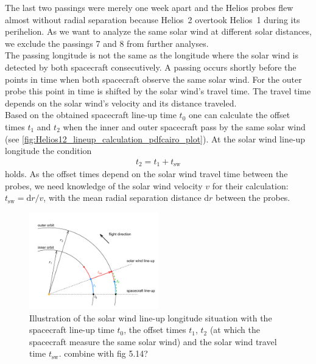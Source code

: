 
The last two passings were merely one week apart and the Helios probes flew almost without radial separation because Helios~2 overtook Helios~1 during its perihelion. As we want to analyze the same solar wind at different solar distances, we exclude the passings 7 and 8 from further analyses.\\


The passing longitude is not the same as the longitude where the solar wind is detected by both spacecraft consecutively. A passing occurs shortly before the points in time when both spacecraft observe the same solar wind. For the outer probe this point in time is shifted by the solar wind's travel time. The travel time depends on the solar wind's velocity and its distance traveled.\\


Based on the obtained spacecraft line-up time $t_0$ one can calculate the offset times $t_1$ and $t_2$ when the inner and outer spacecraft pass by the same solar wind (see \autoref{fig:Helios12_lineup_calculation_pdfcairo_plot}). At the solar wind line-up longitude the condition
\begin{align}
	t_2 = t_1 + t_\text{sw} \label{eq:lineup_condition}
\end{align}
holds. As the offset times depend on the solar wind travel time between the probes, we need knowledge of the solar wind velocity $v$ for their calculation: $t_\text{sw} = \text{d}r/v$, with the mean radial separation distance d$r$ between the probes.
\begin{figure}[htb]
	\centering
	\includegraphics[width=0.5\textwidth]{images/gnuplots/Helios12_lineup_calculation_pdfcairo_plot.pdf}
	\caption{Illustration of the solar wind line-up longitude situation with the spacecraft line-up time $t_0$, the offset times $t_1$, $t_2$ (at which the spacecraft measure the same solar wind) and the solar wind travel time $t_\text{sw}$. combine with fig 5.14?}
	\label{fig:Helios12_lineup_calculation_pdfcairo_plot}
\end{figure}

